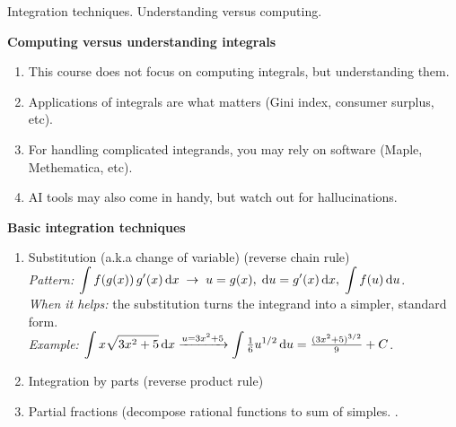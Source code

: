 \documentclass[9pt]{beamer}
\begin{document}
\begin{frame}{Integration techniques. Understanding versus computing.}
\small

    \textbf{Computing versus understanding integrals}
    \begin{enumerate}[leftmargin = 0.5cm, label = $\bullet$, rightmargin = 0.2cm]

    \item This course does not focus on computing integrals, but understanding them.
    \vspace{0.2cm}

    \item Applications of integrals are what matters (Gini index, consumer surplus, etc).
    \vspace{0.2cm}

    \item For handling complicated integrands, you may rely on software (Maple, Methematica, etc).
    \vspace{0.2cm}

    \item AI tools may also come in handy, but watch out for hallucinations.
    \end{enumerate}

    \textbf{Basic integration techniques}
    \begin{enumerate}[leftmargin=0.5cm,label=$\bullet$]
      \item Substitution (a.k.a change of variable) (reverse chain rule) \\
      \textit{Pattern:} $\displaystyle \int f(g(x))\,g'(x)\,\mathrm{d} x \;\to\; u=g(x),\; \mathrm{d} u=g'(x)\,\mathrm{d} x,\; \int f(u)\,\mathrm{d} u$.\\
      \emph{When it helps:} the substitution turns the integrand into a simpler, standard form.\\
      \emph{Example:} $\displaystyle \int x\sqrt{3x^2+5}\,\mathrm{d} x \xrightarrow{u=3x^2+5} \int \tfrac{1}{6}u^{1/2}\,\mathrm{d} u = \tfrac{(3x^2+5)^{3/2}}{9}+C$.
    
      \item Integration by parts (reverse product rule) 
      \item Partial fractions (decompose rational functions to sum of simples.
.\end{enumerate}
    
\end{frame}


\end{document}
